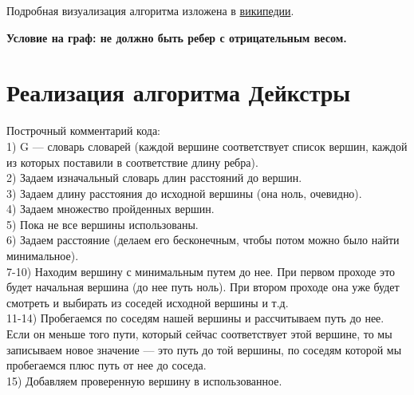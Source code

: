 Подробная визуализация алгоритма изложена в \href{https://ru.wikipedia.org/wiki/%D0%90%D0%BB%D0%B3%D0%BE%D1%80%D0%B8%D1%82%D0%BC_%D0%94%D0%B5%D0%B9%D0%BA%D1%81%D1%82%D1%80%D1%8B#.D0.9D.D0.B5.D1.84.D0.BE.D1.80.D0.BC.D0.B0.D0.BB.D1.8C.D0.BD.D0.BE.D0.B5_.D0.BE.D0.B1.D1.8A.D1.8F.D1.81.D0.BD.D0.B5.D0.BD.D0.B8.D0.B5}{википедии}.

\textbf{Условие на граф: не должно быть ребер с отрицательным весом.}

\section{Реализация алгоритма Дейкстры}
Построчный комментарий кода:\\
1) G --- словарь словарей (каждой вершине соответствует список вершин, каждой из которых поставили в соответствие длину ребра).\\
2) Задаем изначальный словарь длин расстояний до вершин.\\
3) Задаем длину расстояния до исходной вершины (она ноль, очевидно).\\
4) Задаем множество пройденных вершин.\\
5) Пока не все вершины использованы.\\
6) Задаем расстояние (делаем его бесконечным, чтобы потом можно было найти минимальное).\\
7-10) Находим вершину с минимальным путем до нее. При первом проходе это будет начальная вершина (до нее путь ноль). При втором проходе она уже будет смотреть и выбирать из соседей исходной вершины и т.д.\\
11-14) Пробегаемся по соседям нашей вершины и рассчитываем путь до нее. Если он меньше того пути, который сейчас соответствует этой вершине, то мы записываем новое значение --- это путь до той вершины, по соседям которой мы пробегаемся плюс путь от нее до соседа.\\
15) Добавляем проверенную вершину в использованное.\\

